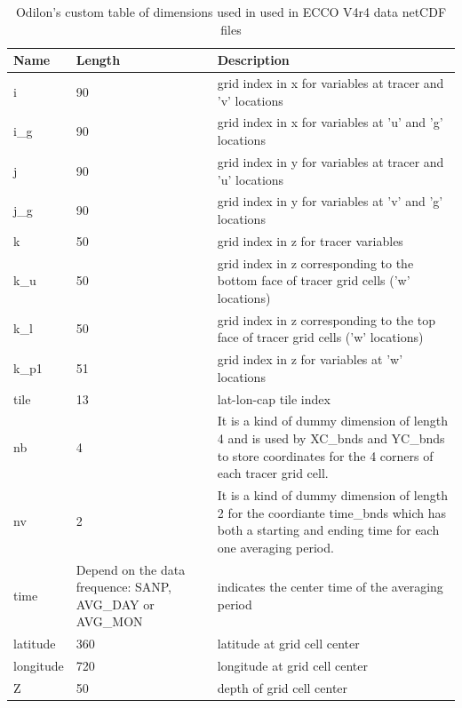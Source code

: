 \begin{longtable}{|p{}|p{}|m{}|}
\caption{Odilon's custom table of dimensions used in used in ECCO V4r4 data netCDF files}
\label{tab:variable-attributes} \\ 
\hline \endhead
\hline \endfoot
\rowcolor{blue!25} \textbf{Name} & \textbf{Length} & \textbf{Description} \\ \hline
\rowcolor{magenta!25}
i & 90 & grid index in x for variables at tracer and 'v' locations \\ \hline
\rowcolor{magenta!25}
i\_g & 90 & grid index in x for variables at 'u' and 'g' locations \\ \hline
\rowcolor{magenta!25}
j & 90 & grid index in y for variables at tracer and 'u' locations \\ \hline
\rowcolor{magenta!25}
j\_g & 90 & grid index in y for variables at 'v' and 'g' locations \\ \hline
\rowcolor{magenta!25}
k & 50 & grid index in z for tracer variables \\ \hline
\rowcolor{magenta!25}
k\_u & 50 & grid index in z corresponding to the bottom face of tracer grid cells ('w' locations) \\ \hline
\rowcolor{magenta!25}
k\_l & 50 & grid index in z corresponding to the top face of tracer grid cells ('w' locations) \\ \hline
\rowcolor{magenta!25}
k\_p1 & 51 & grid index in z for variables at 'w' locations \\ \hline
\rowcolor{magenta!25}
tile & 13 & lat-lon-cap tile index \\ \hline
\rowcolor{magenta!25}
nb & 4 & It is a kind of dummy dimension of length 4 and is used by XC\_bnds and YC\_bnds to store coordinates for the 4 corners of each tracer grid cell. \\ \hline
\rowcolor{magenta!25}
nv & 2 & It is a kind of dummy dimension of length 2 for the coordiante time\_bnds which has both a starting and ending time for each one averaging period. \\ \hline
\rowcolor{magenta!25}
time & Depend on the data frequence: SANP, AVG\_DAY or AVG\_MON & indicates the center time of the averaging period \\ \hline
\rowcolor{magenta!25}
latitude & 360 & latitude at grid cell center \\ \hline
\rowcolor{magenta!25}
longitude & 720 & longitude at grid cell center \\ \hline
\rowcolor{magenta!25}
Z & 50 & depth of grid cell center \\ \hline
\end{longtable}
